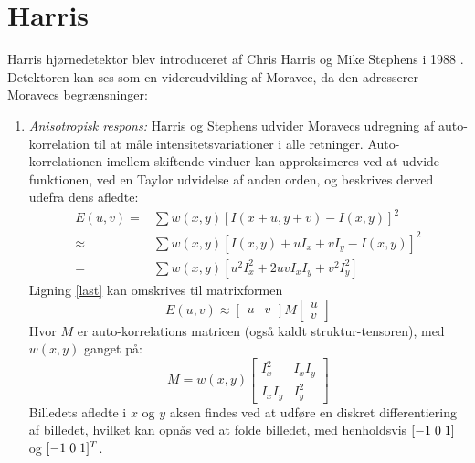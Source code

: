 \section{Harris}\label{sec:harris}
Harris hjørnedetektor blev introduceret af Chris Harris og Mike Stephens i 1988 \cite{harris}. Detektoren kan ses som en videreudvikling af Moravec, da den adresserer Moravecs begrænsninger:
\begin{enumerate}
\item{ \textit{Anisotropisk respons:} Harris og Stephens udvider Moravecs udregning af auto-korrelation til at måle intensitetsvariationer i alle retninger. Auto-korrelationen imellem skiftende vinduer kan approksimeres ved at udvide funktionen, ved en Taylor udvidelse af anden orden, og beskrives derved udefra dens afledte:
\begin{subequations}
\begin{align}
E(u,v) = & \sum w(x,y)[I(x + u, y + v) - I(x,y)]^2 \\
\approx & \sum w(x,y)[I(x,y) + uI_x  + vI_y - I(x,y)]^2 \\
= & \sum w(x,y)[u^2I_x^2 + 2uvI_xI_y + v^2I_y^2]  \label{last}
\end{align}
\end{subequations}
Ligning \eqref{last} kan omskrives til matrixformen
\begin{equation}
E(u,v) \approx
\begin{bmatrix}
        u & v
     \end{bmatrix}
M
\begin{bmatrix}
        u \\
        v
     \end{bmatrix}
\end{equation} 
Hvor $M$ er auto-korrelations matricen (også kaldt struktur-tensoren), med $w(x,y)$ ganget på:
\begin{equation}
M = w(x,y) 
\begin{bmatrix}
	I_x^2 & I_xI_y \\
	I_xI_y & I_y^2
\end{bmatrix}
\label{structens}
\end{equation}
Billedets afledte i $x$ og $y$ aksen findes ved at udføre en diskret differentiering af billedet, hvilket kan opnås
 ved at folde billedet, med henholdsvis $[-1 \hspace{0.1cm} 0 \hspace{0.1cm} 1]$ og $[-1 \hspace{0.1cm} 0 \hspace{0.1cm} 1]^T$. }

\end{enumerate}
